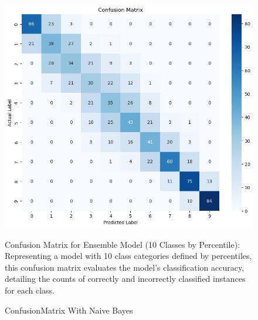 \documentclass{article}
\begin{document}
\begin{figure}[htbp]
    \centering

      \begin{minipage}{\textwidth}
        \centering
        \caption{ConfusionMatrix With Naive Bayes}
        \includegraphics[scale=0.5]{ConfusionMatrix10classpercentile.png}
    \end{minipage}
    Confusion Matrix for Ensemble Model (10 Classes by Percentile): Representing a model with 10 class categories defined by percentiles, this confusion matrix evaluates the model's classification accuracy, detailing the counts of correctly and incorrectly classified instances for each class.


\end{figure}
\end{document}
